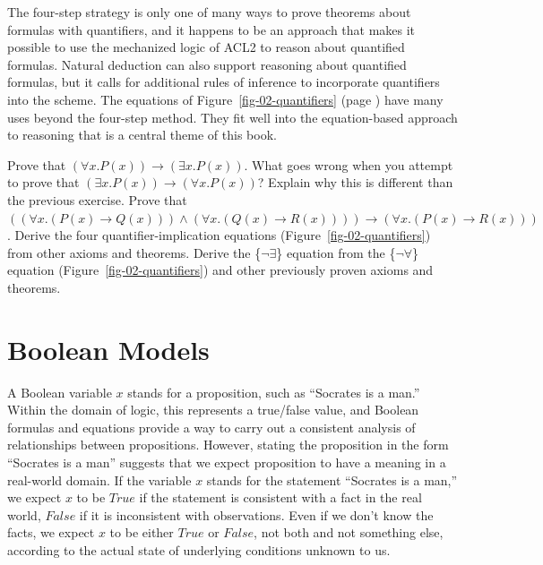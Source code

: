 {{The four-step strategy is only one of many ways to prove theorems about
formulas with quantifiers, and it happens to be an approach that makes
it possible to use the mechanized logic of ACL2
to reason about quantified formulas.
Natural deduction can also support reasoning about quantified formulas,
but it calls for additional rules of inference
to incorporate quantifiers into the scheme.
The equations of Figure~\ref{fig-02-quantifiers} (page \pageref{fig-02-quantifiers})
have many uses beyond the four-step method.
They fit well into the equation-based approach to reasoning that
is a central theme of this book.

\begin{ExerciseList}
\Exercise Prove that $(\forall x.P(x)) \rightarrow (\exists x.P(x))$.
\Exercise What goes wrong when you attempt to prove that $(\exists x.P(x)) \rightarrow (\forall x.P(x))$?
Explain why this is different than the previous exercise.
\Exercise Prove that $((\forall x.(P(x) \rightarrow Q(x))) \wedge (\forall x.(Q(x) \rightarrow R(x)))) \rightarrow (\forall x.(P(x) \rightarrow R(x)))$.
\Exercise Derive the four quantifier-implication equations (Figure~\ref{fig-02-quantifiers})
from other axioms and theorems.
\Exercise Derive the \{$\neg\exists$\} equation from the \{$\neg\forall$\} equation
(Figure~\ref{fig-02-quantifiers}) and
other previously proven axioms and theorems.

\end{ExerciseList}


\section{Boolean Models}
\label{sec:boolean-models}

A Boolean variable $x$
stands for a proposition, such as ``Socrates is a man.''
Within the domain of logic, this represents a true/false value,
and Boolean formulas and equations provide a way to carry out
a consistent analysis of relationships between propositions.
However, stating the proposition in the form ``Socrates is a man''
suggests that we expect proposition to have a meaning in a real-world domain.
If the variable $x$ stands for the statement ``Socrates is a man,''
we expect $x$ to be $True$ if the statement is consistent with a fact
in the real world, $False$ if it is inconsistent with observations.
Even if we don't know the facts, we expect $x$ to be either $True$ or $False$,
not both and not something else,
according to the actual state of underlying conditions unknown to us.

}}
